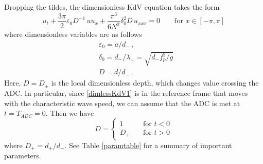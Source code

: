 \documentclass[11pt]{article}
\newcommand{\eps}{\varepsilon}
\newcommand{\freqp}{f_p}
\newcommand{\amp}{a}
\newcommand{\depth}{d}
\newcommand{\dup}{\depth_{-}}
\newcommand{\ddn}{\depth_{+}}
\newcommand{\lam}{\lambda}
\newcommand{\lamup}{\lam_{-}}
\newcommand{\lamfac}{N}
\newcommand{\drat}{D}
\newcommand{\dratdn}{\drat_+}
\newcommand{\dratupdn}{\drat_{\pm}}
\newcommand{\epsup}{\eps_0}
\newcommand{\delup}{\delta_0}
\begin{document}
\begin{comment}
Old Note (around May 2019): After giving it some deliberation, I believe we should use $\lamfac=1$. My reason is that the peak in the wave spectrum occurs at a frequency of $\freqp$ or wavelength of $\lam$. In the tKdV Gibbs measure, the spectrum decays monotonically, so that the peak is at the lowest resolved frequency (or largest resolved wavelength). Thus, we want $\lam$ to correspond to the largest resolved wavelength, i.e.~the length of the periodic domain in the tKdV framework.

New Thought (July 2019): Actually, it is very possible that the bandwidth (2 Hz in the experiments) sets the value of $\lamfac$ that is most appropriate, since that bandwidth sets the decay rate of the spectrum. My thinking is that our experimental forcing does not really follow the upstream Gibbs measure all that well (because we did not have that in mind), but perhaps it best approximates the tail decay of some Gibbs measure. Perhaps, the lowest frequencies (i.e. those much slower than 2 Hz that are present in the theory but almost absent in the experiments) do not affect statistics that much.
\end{comment}

Dropping the tildes, the dimensionless KdV equation takes the form
\begin{equation}
\label{dimlessKdV1}
u_t + \frac{3 \pi}{2} \epsup \drat^{-1} \, u u_x + \frac{\pi^3}{6 \lamfac^2} \delup^2 \drat \, u_{xxx} = 0
\qquad \text{for } x \in [-\pi,\pi]
\end{equation}
where dimensionless variables are as follows
\begin{align}
&\epsup = \amp/\dup \, , \\
&\delup = \dup/\lamup = \sqrt{\dup \freqp^2/g} \, \\
&\drat = {\depth}/{\dup} \, .
\end{align}
Here, $\drat = \dratupdn$ is the local dimensionless depth, which changes value crossing the ADC. In particular, since \eqref{dimlessKdV1} is in the reference frame that moves with the characteristic wave speed, we can assume that the ADC is met at $t = T_{ADC} = 0$. Then we have
\begin{equation}
\drat = 
\begin{cases}
1 		&\quad \mbox{for } t<0 \\
\dratdn 	&\quad \mbox{for } t>0
\end{cases}
\end{equation}
where $\dratdn = \ddn/\dup$.
See Table \ref{paramtable} for a summary of important parameters.
\end{document}
